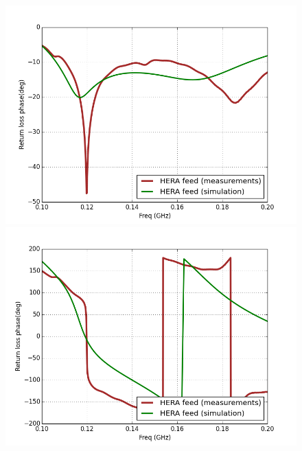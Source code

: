 \documentclass[twocolumn]{emulateapj}
\begin{document}
\begin{figure}[ht]
\begin{minipage}[b]{0.5\linewidth}
\centering
\includegraphics[angle=0, width=\linewidth]{GB_reflectometry_part3/plot/RL_mag_feed.png}
\end{minipage}
\hspace{0.1cm}
\begin{minipage}[b]{0.5\linewidth}
\centering
\includegraphics[angle=0, width=\linewidth]{GB_reflectometry_part3/plot/RL_ph_feed.png}
\end{minipage}
\vspace{0.1cm}  
\begin{minipage}[b]{0.5\linewidth}
\centering

\end{minipage}
\end{figure}
\end{document}
